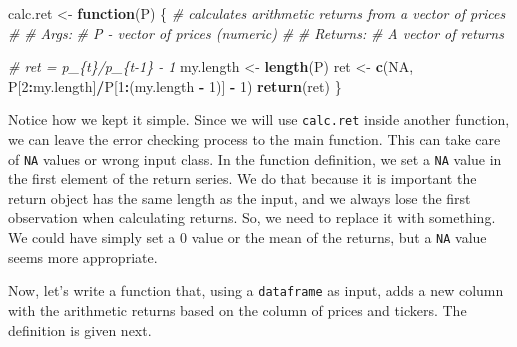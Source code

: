 \documentclass[11pt,]{book}
\newenvironment{Shaded}{\begin{snugshade}}{\end{snugshade}}
\newcommand{\KeywordTok}[1]{\textcolor[rgb]{0.27,0.27,0.27}{\textbf{#1}}}
\newcommand{\DecValTok}[1]{\textcolor[rgb]{0.06,0.06,0.06}{#1}}
\newcommand{\StringTok}[1]{\textcolor[rgb]{0.5,0.5,0.5}{#1}}
\newcommand{\CommentTok}[1]{\textcolor[rgb]{0.56,0.35,0.01}{\textit{#1}}}
\newcommand{\OtherTok}[1]{\textcolor[rgb]{0.56,0.35,0.01}{#1}}
\newcommand{\ControlFlowTok}[1]{\textcolor[rgb]{0.13,0.29,0.53}{\textbf{#1}}}
\newcommand{\OperatorTok}[1]{\textcolor[rgb]{0.81,0.36,0.00}{\textbf{#1}}}
\newcommand{\NormalTok}[1]{#1}
\begin{document}
\begin{Shaded}
\begin{Highlighting}[]
\NormalTok{calc.ret <-}\StringTok{ }\ControlFlowTok{function}\NormalTok{(P) \{}
  \CommentTok{# calculates arithmetic returns from a vector of prices}
  \CommentTok{#}
  \CommentTok{# Args:}
  \CommentTok{#   P - vector of prices (numeric)}
  \CommentTok{#}
  \CommentTok{# Returns:}
  \CommentTok{#   A vector of returns}
  
  \CommentTok{# ret = p_\{t\}/p_\{t-1\} - 1 }
\NormalTok{  my.length <-}\StringTok{ }\KeywordTok{length}\NormalTok{(P)}
\NormalTok{  ret <-}\StringTok{ }\KeywordTok{c}\NormalTok{(}\OtherTok{NA}\NormalTok{, P[}\DecValTok{2}\OperatorTok{:}\NormalTok{my.length]}\OperatorTok{/}\NormalTok{P[}\DecValTok{1}\OperatorTok{:}\NormalTok{(my.length }\OperatorTok{-}\StringTok{ }\DecValTok{1}\NormalTok{)] }\OperatorTok{-}\StringTok{ }\DecValTok{1}\NormalTok{)}
  \KeywordTok{return}\NormalTok{(ret)}
\NormalTok{\}}
\end{Highlighting}
\end{Shaded}

Notice how we kept it simple. Since we will use \texttt{calc.ret} inside
another function, we can leave the error checking process to the main
function. This can take care of \texttt{NA} values or wrong input class.
In the function definition, we set a \texttt{NA} value in the first
element of the return series. We do that because it is important the
return object has the same length as the input, and we always lose the
first observation when calculating returns. So, we need to replace it
with something. We could have simply set a 0 value or the mean of the
returns, but a \texttt{NA} value seems more appropriate.

Now, let's write a function that, using a \texttt{dataframe} as input,
adds a new column with the arithmetic returns based on the column of
prices and tickers. The definition is given next.
\end{document}
